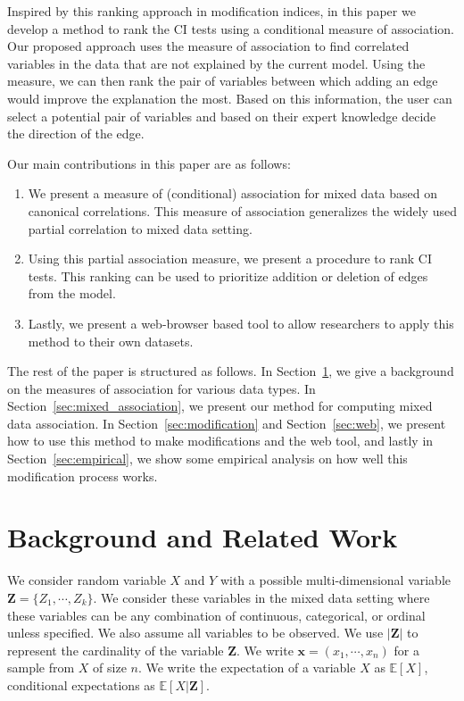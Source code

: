 \documentclass[letterpaper]{article} %
\begin{document}
Inspired by this ranking approach in modification indices, in this paper we
develop a method to rank the CI tests using a conditional measure of
association. Our proposed approach uses the measure of association to find
correlated variables in the data that are not explained by the current model.
Using the measure, we can then rank the pair of variables between which adding
an edge would improve the explanation the most. Based on this information, the
user can select a potential pair of variables and based on their expert
knowledge decide the direction of the edge. 

Our main contributions in this paper are as follows:
\begin{enumerate}
	\item We present a measure of (conditional) association for mixed data
		based on canonical correlations. This measure of association
		generalizes the widely used partial correlation to mixed data
		setting.
	\item Using this partial association measure, we present a procedure to
		rank CI tests. This ranking can be used to prioritize addition
		or deletion of edges from the model.
	\item Lastly, we present a web-browser based tool to allow researchers
		to apply this method to their own datasets.
\end{enumerate}

The rest of the paper is structured as follows. In
Section~\ref{sec:background}, we give a background on the measures of
association for various data types. In Section~\ref{sec:mixed_association}, we
present our method for computing mixed data association. In
Section~\ref{sec:modification} and Section~\ref{sec:web}, we present how to use
this method to make modifications and the web tool, and lastly in
Section~\ref{sec:empirical}, we show some empirical analysis on how well this
modification process works.

\section{Background and Related Work}
\label{sec:background}
We consider random variable $ X $ and $ Y $ with a possible multi-dimensional
variable $ \bm{Z} = \{ Z_1, \cdots, Z_k \} $. We consider these variables in
the mixed data setting where these variables can be any combination of
continuous, categorical, or ordinal unless specified. We also assume all
variables to be observed. We use $ \rvert \bm{Z} \rvert $ to represent the
cardinality of the variable $ \bm{Z} $. We write $ \bm{x} = (x_1, \cdots, x_n)
$ for a sample from $ X $ of size $ n $. We write the expectation of a variable
$ X $ as $ \mathbb{E}[X] $, conditional expectations as $ \mathbb{E}[X |
\bm{Z}] $.
\end{document}
